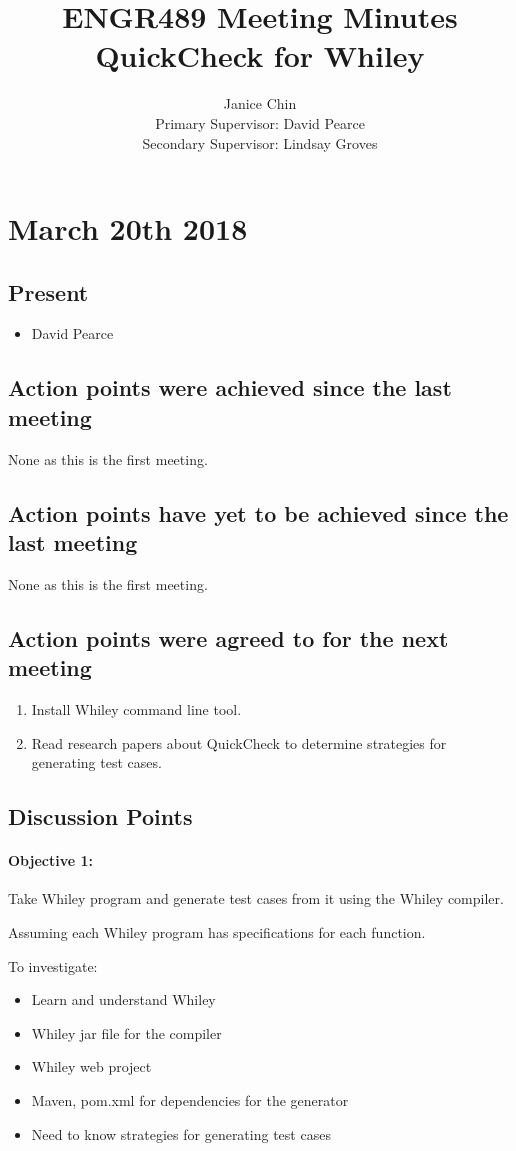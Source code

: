 \documentclass[]{article}
\title{ENGR489 Meeting Minutes \\ QuickCheck for Whiley}
\author{Janice Chin \\ Primary Supervisor: David Pearce \\ Secondary Supervisor: Lindsay Groves}
\date{}
\begin{document}
	
\maketitle

\section{March 20th 2018}
\subsection{Present}
\begin{itemize}
	\item David Pearce
\end{itemize}
\subsection{Action points were achieved since the last meeting}
None as this is the first meeting.
\subsection{Action points have yet to be achieved since the last meeting}
None as this is the first meeting.
\subsection{Action points were agreed to for the next meeting}
\begin{enumerate}
	\item Install Whiley command line tool.
	\item Read research papers about QuickCheck to determine strategies for generating test cases.
\end{enumerate}

\subsection{Discussion Points}

\paragraph{Objective 1:} Take Whiley program and generate test cases from it using the Whiley compiler. 

Assuming each Whiley program has specifications for each function.

To investigate:
\begin{itemize}
	\item Learn and understand Whiley
	\item Whiley jar file for the compiler
	\item Whiley web project
	\item Maven, pom.xml for dependencies for the generator
	\item Need to know strategies for generating test cases
\end{itemize}
\end{document}
